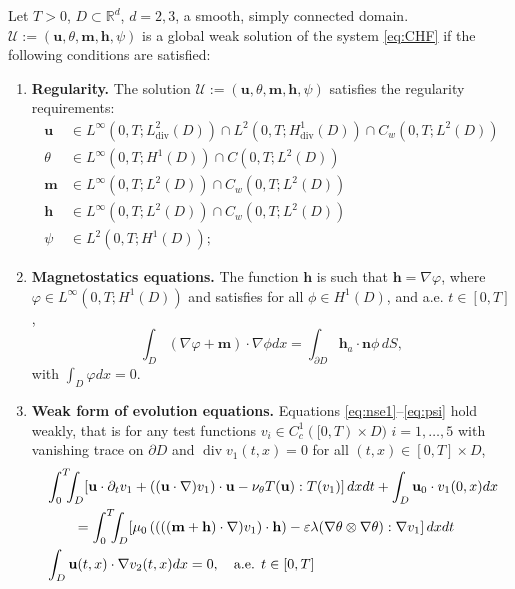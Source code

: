 \documentclass[10pt,letterpaper,twoside]{amsart}
\theoremstyle{definition}{\newtheorem{definition}[lemma]{Definition}}
\theoremstyle{note}{\newtheorem{claim}{Claim}[section]
\newtheorem*{claim*}{Claim}}
\numberwithin{equation}{section}
\newcommand{\dom}{D}
\newcommand{\sol}{\mathcal{U}}
\newcommand{\R}{\mathbb{R}}
\newcommand{\Grad}{\nabla}
\newcommand{\Div}{\operatorname{div}}
\newcommand{\hdiv}{L^2_{\Div}(\dom)}
\newcommand{\V}{H^1_{\Div}(\dom)}
\newcommand{\bu}{\mathbf{u}}
\newcommand{\bm}{\mathbf{m}}
\newcommand{\bh}{\mathbf{h}}
\newcommand{\lint}{\int_0^T\!\!\!\int_{\dom}\!}
\begin{document}
\begin{definition}
	\label{def:weaksol}
	Let $T>0$, $\dom\subset\R^d$, $d=2,3$, a smooth, simply connected domain.   $\sol:=(\bu,\theta,\bm,\bh,\psi)$ is a global weak solution of the system \eqref{eq:CHF} if the following conditions are satisfied:
	\begin{enumerate}[label=(\roman*)]
		\item {\textbf{Regularity.}} The solution $\sol:=(\bu,\theta,\bm,\bh,\psi)$ satisfies the regularity requirements:
		\begin{align*}
			\bu&\in L^\infty(0,T;\hdiv)\cap L^2(0,T;\V)\cap C_w(0,T;L^2(\dom))\\
			\theta & \in L^\infty(0,T;H^1(\dom)) \cap C(0,T;L^2(\dom))\\
			\bm & \in L^\infty(0,T;L^2(\dom))\cap C_w(0,T;L^2(\dom))\\
			\bh & \in L^\infty(0,T;L^2(\dom))\cap C_w(0,T;L^2(\dom))\\
			\psi & \in L^2(0,T;H^1(\dom));
		\end{align*}
		\item \textbf{Magnetostatics equations.} The function $\bh$ is such that $\bh=\Grad \varphi$, where $\varphi\in L^\infty(0,T;H^1(\dom))$ and satisfies for all $\phi\in H^1(\dom)$, and a.e. $t\in [0,T]$,
		\begin{equation}\label{eq:ellipticeqforvphi}
			\int_{\dom} (\Grad\varphi+\bm) \cdot\Grad\phi dx =\int_{\partial\dom} \bh_a\cdot\mathbf{n}  \phi\, dS,
		\end{equation}
		with $\int_{\dom} \varphi dx =0$. 
		\item \textbf{Weak form of evolution equations.} Equations \eqref{eq:nse1}--\eqref{eq:psi} hold weakly, that is for any test functions $v_i\in C^1_c([0,T)\times\dom)$ $i=1,\dots,5$ with vanishing trace on $\partial\dom$ and $\Div v_1(t,x) = 0$ for all $(t,x)\in[0,T]\times\dom$, 
		\begin{align}
			&\lint \left[\bu\cdot\partial_tv_1+((\bu\cdot\Grad)v_1)\cdot\bu -\nu_\theta T(\bu):T (v_1) \right]dx dt + \int_{\dom} \bu_0\cdot v_1(0,x) dx\label{eq:nseweak}\\ 
			&\qquad=\lint\left[ \mu_0\left(\left(((\bm+\bh)\cdot\Grad)v_1\right)\cdot\bh \right) - \varepsilon \lambda(\Grad\theta\otimes\Grad\theta):\Grad v_1\right] dx dt\notag\\
			&\int_{\dom}\bu(t,x)\cdot\Grad v_2(t,x) dx = 0,\quad \text{a.e. } t\in [0,T]\label{eq:nsedivconstraint}\\

\end{align}
\end{enumerate}
\end{definition}
\end{document}

